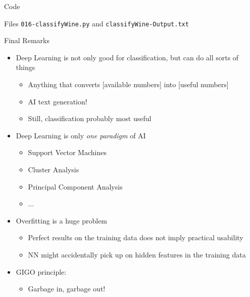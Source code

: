 
\begin{frame}{Code}
%
\begin{center}
	Files \texttt{016-classifyWine.py} and \texttt{classifyWine-Output.txt}
\end{center}
%
\end{frame}


\begin{frame}{Final Remarks}
%
\begin{itemize}
\item Deep Learning is not only good for classification, but can do all sorts of things
	\begin{itemize}
	\item Anything that converts [available numbers] into [useful numbers]
	\item AI text generation!
	\item Still, classification probably most useful
	\end{itemize}
\item Deep Learning is only \emph{one paradigm} of AI
	\begin{itemize}
	\item Support Vector Machines
	\item Cluster Analysis
	\item Principal Component Analysis
	\item ...
	\end{itemize}
\item Overfitting is a huge problem
	\begin{itemize}
	\item Perfect results on the training data does not imply practical usability
	\item NN might accidentally pick up on hidden features in the training data
	\end{itemize}
\item GIGO principle:
	\begin{itemize}
	\item Garbage in, garbage out!
	\end{itemize}
\end{itemize}
%
\end{frame}